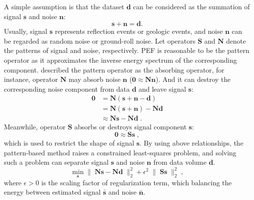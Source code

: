 A simple assumption is that the dataset $\mathbf{d}$ can be considered as the
summation of signal $\mathbf{s}$ and noise $\mathbf{n}$:
\begin{equation}
    \label{eq:signoi1}
    \mathbf{s} + \mathbf{n} =  \mathbf{d} .
\end{equation}
Usually, signal $\mathbf{s}$ represents reflection events or geologic events,
and noise $\mathbf{n}$ can be regarded as random noise or ground-roll noise.
Let operators $\mathbf{S}$ and $\mathbf{N}$ denote the patterns of signal and
noise, respectively. PEF is reasonable to be the pattern operator as it
approximates the inverse energy spectrum of the corresponding component.
\cite{Claerbout10} described the pattern operator as the absorbing operator,
for instance, operator $\mathbf{N}$ may absorb noise $\mathbf{n}$
($\mathbf{0} \approx \mathbf{Nn}$). And it can destroy the corresponding
noise component from data $\mathbf{d}$ and leave signal $\mathbf{s}$:
\begin{equation}
    \label{eq:Nsn}
    \begin{aligned}
        \mathbf{0}
         & = \mathbf{N} ( \mathbf{s} + \mathbf{n} - \mathbf{d} ) \\
         & = \mathbf{N} ( \mathbf{s} + \mathbf{n}) - \mathbf{Nd} \\
         & \approx \mathbf{Ns} - \mathbf{Nd}\; .
    \end{aligned}
\end{equation}
Meanwhile, operator $\mathbf{S}$ absorbs or destroys signal component
$\mathbf{s}$:
\begin{equation}
    \label{eq:S}
    \mathbf{0} \approx \mathbf{Ss} \; ,
\end{equation}
which is used to restrict the shape of signal $\mathbf{s}$. By using above
relationships, the pattern-based method raises a constrained least-squares
problem, and solving such a problem can separate signal $\mathbf{s}$ and
noise $\mathbf{n}$ from data volume $\mathbf{d}$.
\begin{equation}
    \label{eq:NsNd}
    \min_{\mathbf{s}} \| \; \mathbf{Ns} - \mathbf{Nd} \; \|_{2}^{2}
    + \epsilon^{2} \; \| \; \mathbf{Ss} \; \|_{2}^{2} \; ,
\end{equation}
where $ \epsilon > 0 $ is the scaling factor of regularization term, which
balancing the energy between estimated signal $\mathbf{\bar{s}}$ and
noise $\mathbf{\bar{n}}$.

